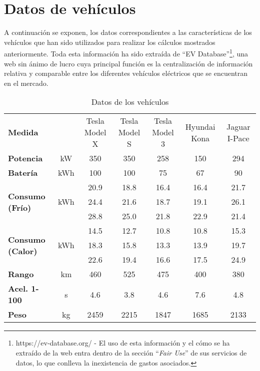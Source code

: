 \documentclass[11pt,spanish,listoffigures,listoftables]{tfgetsinf}
\begin{document}
\cleardoublepage

\APPENDIX

\chapter{Datos de vehículos}
A continuación se exponen, los datos correspondientes a las características de los vehículos que han sido utilizados para realizar los cálculos mostrados anteriormente. Toda esta información ha sido extraída de ``EV Database''\footnote{https://ev-database.org/ - El uso de esta información y el cómo se ha extraído de la web entra dentro de la sección ``\textit{Fair Use}'' de sus servicios de datos, lo que conlleva la inexistencia de gastos asociados.}, una web sin ánimo de lucro cuya principal función es la centralización de información relativa y comparable entre los diferentes vehículos eléctricos que se encuentran en el mercado.

\begin{table}[h]
    \centering
    \begin{tabular}{m{}*{6}{c}}
    \toprule
    \multirow{2}{4em}{\textbf{Medida}} &  & \multirow{2}{4em}{\centering Tesla Model X} & \multirow{2}{4em}{\centering Tesla Model S} & \multirow{2}{4em}{\centering Tesla Model 3} & \multirow{2}{4em}{\centering Hyundai Kona} & \multirow{2}{4em}{\centering Jaguar I-Pace} \\
    \\
    \toprule
    \textbf{Potencia} & kW & 350 & 350 & 258 & 150 & 294 \\
    \textbf{Batería} & kWh & 100 & 100 & 75 & 67 & 90 \\
    \midrule
    \multirow{3}{4em}{\textbf{Consumo (Frío)}} & \multirow{3}{2em}{\centering kWh} & 20.9 & 18.8 & 16.4 & 16.4 & 21.7 \\
    & & 24.4 & 21.6 & 18.7 & 19.1 & 26.1 \\
    & & 28.8 & 25.0 & 21.8 & 22.9 & 21.4 \\
    \midrule
    \multirow{3}{4em}{\textbf{Consumo (Calor)}} & \multirow{3}{2em}{\centering kWh} & 14.5 & 12.7 & 10.8 & 10.8 & 15.3 \\
    & & 18.3 & 15.8 & 13.3 & 13.9 & 19.7 \\
    & & 22.6 & 19.4 & 16.6 & 17.5 & 24.9 \\
    \midrule
    \textbf{Rango} & km & 460 & 525 & 475 & 400 & 380 \\
    \textbf{Acel. 1-100} & s & 4.6 & 3.8 & 4.6 & 7.6 & 4.8 \\
    \textbf{Peso} & kg & 2459 & 2215 & 1847 & 1685 & 2133 \\
    \bottomrule
    \end{tabular}
    \caption{Datos de los vehículos}
    \label{tab:vehicle_data}
\end{table}
\end{document}
